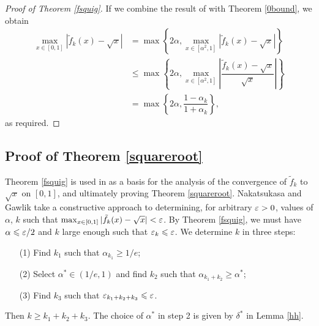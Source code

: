 \begin{appendices}
\begin{proof}[Proof of Theorem \ref{fsquig}]
If we combine the result of \cite[Theorem 3.1]{Gawlik} with Theorem \ref{0bound}, we obtain
\begin{align*}
    \max_{x\in[0,1]}|\tilde{f}_k(x)-\sqrt{x}| &=\max\left\{2\alpha,\max_{x\in[\alpha^2,1]}|\tilde{f}_k(x)-\sqrt{x}|\right\}\\
    & \leq \max \left\{2\alpha,\max_{x\in[\alpha^2,1]}\left|\dfrac{\tilde{f}_k(x)-\sqrt{x}}{\sqrt{x}}\right|\right\}\\
    & = \max\left\{2\alpha,\dfrac{1-\alpha_k}{1+\alpha_k}\right\},
\end{align*}
as required.
\end{proof}

\subsection{Proof of Theorem \texorpdfstring{\ref{squareroot}}{(4.1)}}

Theorem \ref{fsquig} is used in \cite{Yuji} as a basis for the analysis of the convergence of $\tilde{f}_k$ to $\sqrt{x}$ on $[0,1]$, and ultimately proving Theorem \ref{squareroot}. Nakatsukasa and Gawlik take a constructive approach to determining, for arbitrary $\varepsilon>0$, values of $\alpha$, $k$ such that $\max_{x\in[0,1]}|\tilde{f}_k(x)-\sqrt{x}|< \varepsilon$. By Theorem \ref{fsquig}, we must have $\alpha \leqslant \varepsilon/2$ and $k$ large enough such that $\varepsilon_k \leqslant \varepsilon$. We determine $k$ in three steps:

\begin{enumerate}
    \item[(1)] Find $k_1$ such that $\alpha_{k_1} \geq 1/e$;
    \item[(2)] Select $\alpha^* \in (1/e,1)$ and find $k_2$ such that $\alpha_{k_1+k_2} \geq \alpha^*$;
    \item[(3)] Find $k_3$ such that $\varepsilon_{k_1+k_2+k_3}\leqslant \varepsilon$. 
\end{enumerate}


Then $k\geq k_1+k_2+k_3$. The choice of $\alpha^*$ in step 2 is given by $\delta^*$ in Lemma \ref{hh}.


\end{appendices}

